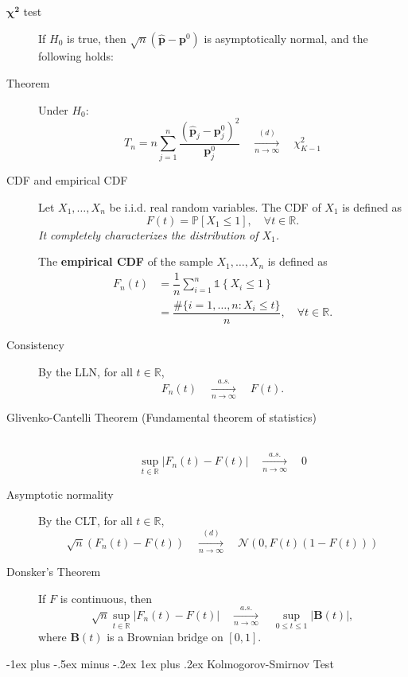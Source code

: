 \documentclass[a4paper, 10pt,landscape]{article}
\makeatletter
\renewcommand{\subsubsection}{\@startsection{subsubsection}{3}{0mm}%
                                {-1ex plus -.5ex minus -.2ex}%
                                {1ex plus .2ex}%
                                {\normalfont\small\bfseries}}
\makeatother
\begin{document}
\begin{multicols*}{3}
\begin{description}
\begin{itemize}
	\end{itemize}
	\item[$\mathbf{\chi^2}$ test] If $H_0$ is true, then $\sqrt{n}\left(\widehat{\mathbf{p}}-\mathbf{p}^0\right)$ is asymptotically normal, and the following holds:
	\item[Theorem] Under $H_0$:
	$$T_n=n\sum_{j=1}^{n}\dfrac{\left(\widehat{\mathbf{p}}_j-\mathbf{p}_j^0\right)^2}{\mathbf{p}_j^0}\quad\xrightarrow[n\rightarrow\infty]{(d)}\quad\chi_{K-1}^2$$
	\item[CDF and empirical CDF] Let $X_1,\dots,X_n$ be i.i.d. real random variables. The CDF of $X_1$ is defined as
	$$F(t)=\mathbb{P}\left[X_1\leq1\right],\quad\forall t\in\mathbb{R}.$$
	{\it It completely characterizes the distribution of $X_1$.}
	
	The {\bf empirical CDF} of the sample $X_1,\dots,X_n$ is defined as
	\begin{align*}
		F_n(t)&=\dfrac{1}{n}\sum_{i=1}^{n}\mathds{1}\left\{X_i\leq 1\right\}\\
		&=\dfrac{\#\{i=1,\dots,n:X_i\leq t\}}{n},\quad\forall t\in\mathbb{R}.
	\end{align*}
	\item[Consistency] By the LLN, for all $t\in\mathbb{R}$,
	$$F_n(t)\quad\xrightarrow[n\rightarrow\infty]{a.s.}\quad F(t).$$
	\item[Glivenko-Cantelli Theorem (Fundamental theorem of statistics)] ~
	$$\sup\limits_{t\in\mathbb{R}}\left|F_n(t)-F(t)\right|\quad\xrightarrow[n\rightarrow\infty]{a.s.}\quad0$$
	\item[Asymptotic normality] By the CLT, for all $t\in\mathbb{R}$,
	$$\sqrt{n}\left(F_n(t)-F(t)\right)\quad\xrightarrow[n\rightarrow\infty]{(d)}\quad\mathcal{N}\left(0,F(t)\left(1-F(t)\right)\right)$$
	\item[Donsker's Theorem] If $F$ is continuous, then
	$$\sqrt{n}\sup\limits_{t\in\mathbb{R}}\left|F_n(t)-F(t)\right|\quad\xrightarrow[n\rightarrow\infty]{a.s.}\quad\sup\limits_{0\leq t\leq 1}\left|\mathbf{B}(t)\right|,$$
	where $\mathbf{B}(t)$ is a Brownian bridge on $[0,1]$.
\end{description}

\subsubsection{Kolmogorov-Smirnov Test}


\end{multicols*}
\end{document}
